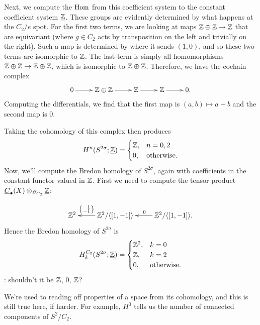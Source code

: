 \begin{exm}
\iffalse
In terms of matrices, the differentials are given by
\[\xymatrix{
	0 \ar[r] & \Z\oplus\Z \ar[r]^-{\text{\tiny$\matr 1{-1}1{-1}$}} & \Z\oplus\Z \ar[r]^-{\text{\tiny$\matr 1{-1}{-1}1$}} & \Z\oplus\Z \ar[r] & 0
}\]
\fi

Next, we compute the $\operatorname{Hom}$ from this coefficient system to the constant coefficient system $\underline{\mathbb Z}$.  These groups are evidently determined by what happens at the $C_2/e$ spot.  For the first two terms, we are looking at maps $\mathbb Z \oplus \mathbb Z \to \mathbb Z$ that are equivariant (where $g \in C_2$ acts by transposition on the left and trivially on the right).  Such a map is determined by where it sends $(1,0)$, and so these two terms are isomorphic to $\mathbb Z$.  The last term is simply all homomorphisms $\mathbb Z \oplus \mathbb Z \to \mathbb Z \oplus \mathbb Z$, which is isomorphic to $\mathbb Z \oplus \mathbb Z$.
Therefore, we have the cochain complex
\[
\shortexact{\Z \oplus \Z}{\Z}{\Z}.
\]
Computing the differentials, we find that the first map is $(a,b) \mapsto a+b$ and the second map is $0$.

Taking the cohomology of this complex then produces
\[H^n(S^{2\sigma};\underline{\mathbb Z}) = \begin{cases}
	\mathbb Z, & n = 0, 2\\
	0, &\text{otherwise.}
\end{cases}\]
Now, we'll compute the Bredon homology of $S^{2\sigma}$, again with coefficients in the constant functor valued in
$\mathbb Z$. First we need to compute the tensor product $\underline C_\bullet(X)\otimes_{\mathscr O_{C_2}}\underline{\mathbb Z}$:


\[\xymatrix{
	\Z^2 & \Z^2/\ang{[1,-1]}\ar[l]_-{\begin{psmallmatrix*}[r]1\\-1\end{psmallmatrix*}} & \Z^2/\ang{[1,-1]}.\ar[l]_0
}\]
Hence the Bredon homology of $S^{2\sigma}$ is
\[H^{C_2}_k(S^{2\sigma}; \underline{\mathbb Z}) = \begin{cases}
	\mathbb Z^2, &k = 0\\
	\mathbb Z, &k = 2\\
	0, &\text{otherwise.}
\end{cases}\]
\TODO: shouldn't it be $\mathbb Z$, $0$, $\mathbb Z$?
\end{exm}
\begin{rem}
We're used to reading off properties of a space from its cohomology, and this is still true here, if harder. For
example, $H^0$ tells us the number of connected components of $S^2/C_2$.
\end{rem}
